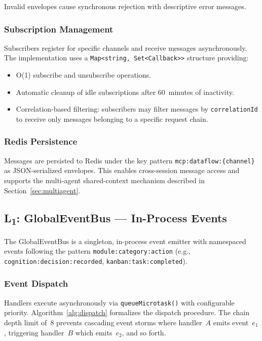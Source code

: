\documentclass[journal,10pt]{IEEEtran}
\newcommand{\code}[1]{\texttt{#1}}
\newcommand{\layerone}{L\textsubscript{1}}
\begin{document}
\noindent Invalid envelopes cause synchronous rejection with descriptive error messages.

\subsubsection{Subscription Management}

Subscribers register for specific channels and receive messages asynchronously. The implementation uses a \code{Map<string, Set<Callback>>} structure providing:

\begin{itemize}[nosep]
\item O(1) subscribe and unsubscribe operations.
\item Automatic cleanup of idle subscriptions after 60~minutes of inactivity.
\item Correlation-based filtering: subscribers may filter messages by \code{correlationId} to receive only messages belonging to a specific request chain.
\end{itemize}

\subsubsection{Redis Persistence}

Messages are persisted to Redis under the key pattern \code{mcp:dataflow:\{channel\}} as JSON-serialized envelopes. This enables cross-session message access and supports the multi-agent shared-context mechanism described in Section~\ref{sec:multiagent}.

\subsection{\layerone: GlobalEventBus --- In-Process Events}
\label{sec:l1}

The GlobalEventBus is a singleton, in-process event emitter with namespaced events following the pattern \code{module:category:action} (e.g., \code{cognition:decision:recorded}, \code{kanban:task:completed}).

\subsubsection{Event Dispatch}

Handlers execute asynchronously via \code{queueMicrotask()} with configurable priority. Algorithm~\ref{alg:dispatch} formalizes the dispatch procedure. The chain depth limit of~8 prevents cascading event storms where handler~$A$ emits event~$e_1$, triggering handler~$B$ which emits~$e_2$, and so forth.
\end{document}

